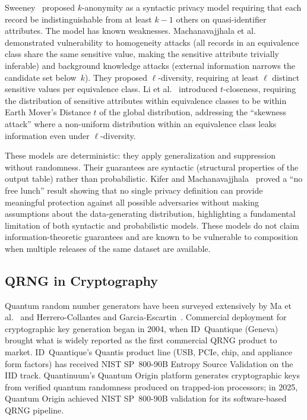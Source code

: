 \documentclass[journal]{IEEEtran}
\begin{document}
Sweeney~\cite{sweeney2002kanon} proposed $k$-anonymity as a syntactic privacy model requiring that each record be indistinguishable from at least $k{-}1$ others on quasi-identifier attributes. The model has known weaknesses. Machanavajjhala et al.~\cite{machanavajjhala2007ldiv} demonstrated vulnerability to homogeneity attacks (all records in an equivalence class share the same sensitive value, making the sensitive attribute trivially inferable) and background knowledge attacks (external information narrows the candidate set below~$k$). They proposed $\ell$-diversity, requiring at least $\ell$ distinct sensitive values per equivalence class. Li et al.~\cite{li2007tcloseness} introduced $t$-closeness, requiring the distribution of sensitive attributes within equivalence classes to be within Earth Mover's Distance $t$ of the global distribution, addressing the ``skewness attack'' where a non-uniform distribution within an equivalence class leaks information even under $\ell$-diversity.

These models are deterministic: they apply generalization and suppression without randomness. Their guarantees are syntactic (structural properties of the output table) rather than probabilistic. Kifer and Machanavajjhala~\cite{kifer2011nofree} proved a ``no free lunch'' result showing that no single privacy definition can provide meaningful protection against all possible adversaries without making assumptions about the data-generating distribution, highlighting a fundamental limitation of both syntactic and probabilistic models. These models do not claim information-theoretic guarantees and are known to be vulnerable to composition when multiple releases of the same dataset are available.

\subsection{QRNG in Cryptography}
\label{subsec:qrng_crypto}

Quantum random number generators have been surveyed extensively by Ma et al.~\cite{ma2016qrng} and Herrero-Collantes and Garcia-Escartin~\cite{herrero2017qrng}. Commercial deployment for cryptographic key generation began in 2004, when ID~Quantique (Geneva) brought what is widely reported as the first commercial QRNG product to market. ID~Quantique's Quantis product line (USB, PCIe, chip, and appliance form factors) has received NIST SP~800-90B Entropy Source Validation on the IID track. Quantinuum's Quantum Origin platform generates cryptographic keys from verified quantum randomness produced on trapped-ion processors; in 2025, Quantum Origin achieved NIST SP~800-90B validation for its software-based QRNG pipeline.
\end{document}
